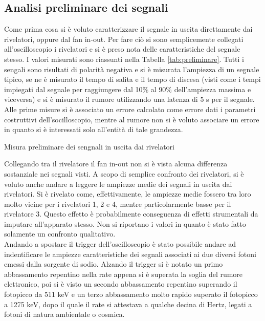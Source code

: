 \subsection{Analisi preliminare dei segnali}

Come prima cosa si è voluto caratterizzare il segnale in uscita direttamente dai rivelatori, oppure dal fan in-out. Per fare ciò si sono semplicemente collegati
all'oscilloscopio i rivelatori e si è preso nota delle caratteristiche del segnale stesso. I valori misurati sono riassunti nella Tabella \ref{tab:preliminare}.
Tutti i sengali sono risultati
di polarità negativa e si è misurata l'ampiezza di un segnale tipico, se ne è misurato il tempo di salita e il tempo di discesa (visti come i tempi impiegati dal segnale
per raggiungere dal 10\% al 90\% dell'ampiezza massima e viceversa) e si è misurato il rumore utilizzando una latenza di 5 s per il segnale. Alle prime misure si è
associato un errore calcolato come errore dati i parametri costruttivi dell'socilloscopio, mentre al rumore non si è voluto associare un errore in quanto si è interessati
solo all'entità di tale grandezza.
%
\begin{table}[h]
	\centering
	
	\caption{Misura preliminare dei sengnali in uscita dai rivelatori}
	\label{tab:preliminare}
\end{table}
%
Collegando tra il rivelatore il fan in-out non si è vista alcuna differenza sostanziale nei segnali visti.
A scopo di semplice confronto dei rivelatori, si è voluto anche andare a leggere le ampiezze medie dei segnali in uscita dai rivelatori. Si è rivelato come, effettivamente, 
le ampiezze medie fossero tra loro molto vicine per i rivelatori 1, 2 e 4, mentre particolarmente basse per il rivelatore 3. Questo effetto è probabilmente conseguenza
di effetti strumentali da imputare all'apparato stesso. Non si riportano i valori in quanto è stato fatto solamente un confronto qualitativo.\\

Andando a spostare il trigger dell'oscilloscopio è stato possibile andare ad indentificare le ampiezze caratteristiche dei segnali associati ai due diversi fotoni emessi dalla
sorgente di sodio. Alzando il trigger si è notato un primo abbassamento repentino nella rate appena si è superata la soglia del rumore elettronico, poi si è visto
un secondo abbassamento repentino superando il fotopicco da 511 keV e un terzo abbassamento molto rapido superato il fotopicco a 1275 keV, dopo il quale il rate si attestava
a qualche decina di Hertz, legati a fotoni di natura ambientale o cosmica.\\

